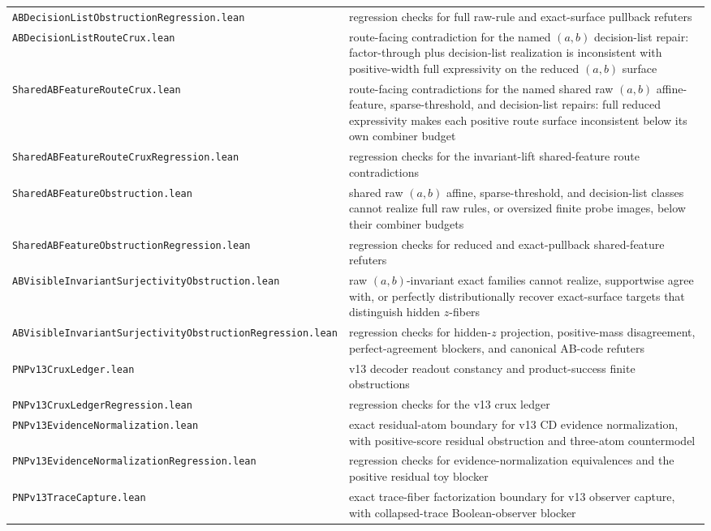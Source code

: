 \documentclass[11pt]{article}
\theoremstyle{remark}
\begin{document}
\begin{center}
\begin{tabular}{ll}
\texttt{ABDecisionListObstructionRegression.lean} & regression checks for full raw-rule and exact-surface pullback refuters \\
\texttt{ABDecisionListRouteCrux.lean} & route-facing contradiction for the named \((a,b)\) decision-list repair: factor-through plus decision-list realization is inconsistent with positive-width full expressivity on the reduced \((a,b)\) surface \\
\texttt{SharedABFeatureRouteCrux.lean} & route-facing contradictions for the named shared raw \((a,b)\) affine-feature, sparse-threshold, and decision-list repairs: full reduced expressivity makes each positive route surface inconsistent below its own combiner budget \\
\texttt{SharedABFeatureRouteCruxRegression.lean} & regression checks for the invariant-lift shared-feature route contradictions \\
\texttt{SharedABFeatureObstruction.lean} & shared raw \((a,b)\) affine, sparse-threshold, and decision-list classes cannot realize full raw rules, or oversized finite probe images, below their combiner budgets \\
\texttt{SharedABFeatureObstructionRegression.lean} & regression checks for reduced and exact-pullback shared-feature refuters \\
\texttt{ABVisibleInvariantSurjectivityObstruction.lean} & raw \((a,b)\)-invariant exact families cannot realize, supportwise agree with, or perfectly distributionally recover exact-surface targets that distinguish hidden \(z\)-fibers \\
\texttt{ABVisibleInvariantSurjectivityObstructionRegression.lean} & regression checks for hidden-\(z\) projection, positive-mass disagreement, perfect-agreement blockers, and canonical AB-code refuters \\
\texttt{PNPv13CruxLedger.lean} & v13 decoder readout constancy and product-success finite obstructions \\
\texttt{PNPv13CruxLedgerRegression.lean} & regression checks for the v13 crux ledger \\
\texttt{PNPv13EvidenceNormalization.lean} & exact residual-atom boundary for v13 CD evidence normalization, with positive-score residual obstruction and three-atom countermodel \\
\texttt{PNPv13EvidenceNormalizationRegression.lean} & regression checks for evidence-normalization equivalences and the positive residual toy blocker \\
\texttt{PNPv13TraceCapture.lean} & exact trace-fiber factorization boundary for v13 observer capture, with collapsed-trace Boolean-observer blocker \\

\end{tabular}
\end{center}
\end{document}
